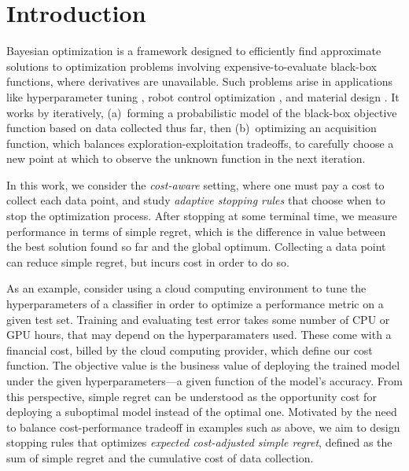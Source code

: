 \section{Introduction}
\label{sec:intro}

Bayesian optimization is a framework designed to efficiently find approximate solutions to optimization problems involving expensive-to-evaluate black-box functions, where derivatives are unavailable. Such problems arise in applications like hyperparameter tuning \citep{snoek2012practical}, robot control optimization \citep{martinez2017bayesian}, and material design \citep{zhang2020bayesian}. 
It works by iteratively, (a)~forming a probabilistic model of the black-box objective function based on data collected thus far, then (b)~optimizing an acquisition function, which balances exploration-exploitation tradeoffs, to carefully choose a new point at which to observe the unknown function in the next iteration.

In this work, we consider the \emph{cost-aware} setting, where one must pay a cost to collect each data point, and study \emph{adaptive stopping rules} that choose when to stop the optimization process.
After stopping at some terminal time, we measure performance in terms of simple regret, which is the difference in value between the best solution found so far and the global optimum.
Collecting a data point can reduce simple regret, but incurs cost in order to do so.

As an example, consider using a cloud computing environment to tune the hyperparameters of a classifier in order to optimize a performance metric on a given test set.
Training and evaluating test error takes some number of CPU or GPU hours, that may depend on the hyperparamaters used. 
These come with a financial cost, billed by the cloud computing provider, which define our cost function.
The objective value is the business value of deploying the trained model under the given hyperparameters---a given function of the model's accuracy.
From this perspective, simple regret can be understood as the opportunity cost for deploying a suboptimal model instead of the optimal one. Motivated by the need to balance cost-performance tradeoff in examples such as above, we aim to design stopping rules that optimizes \emph{expected cost-adjusted simple regret}, defined as the sum of simple regret and the cumulative cost of data collection.

